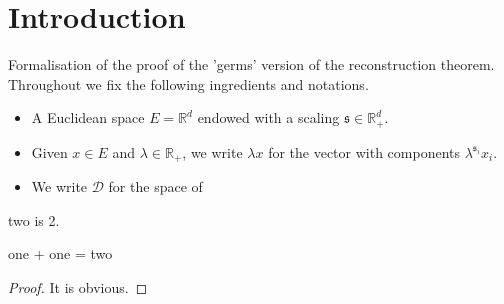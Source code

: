 \chapter{Introduction}
\label{chap:intro}

\def\R{\mathbb{R}}
\def\CD{\mathcal{D}}
\def\s{\mathfrak{s}}

Formalisation of the proof of the 'germs' version of the reconstruction theorem.
Throughout we fix the following ingredients and notations.
\begin{itemize}
\item A Euclidean space $E = \R^d$ endowed with a scaling $\s \in \R_+^d$.
\item Given $x \in E$ and $\lambda \in \R_+$, we write $\lambda x$ for the vector with components
$\lambda^{\s_i} x_i$.
\item We write $\CD$ for the space of 
\end{itemize}


\begin{definition}[One]
\label{one}
\leanok


\end{definition}

\begin{definition}[Two]
\label{two}
\leanok

    two is 2.

\end{definition}

\begin{lemma}
\label{one_plus_one_eq_two}
\leanok

one + one = two

\end{lemma}

\begin{proof}
\leanok
It is obvious.
\end{proof}